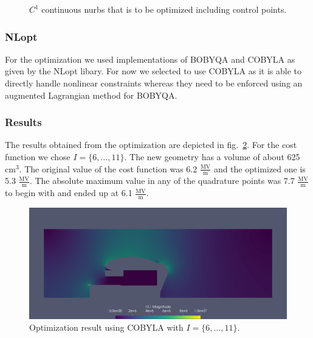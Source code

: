 \begin{center}
\begin{figure}[H]
  
  \caption{$C^1$ continuous nurbs that is to be optimized including control points.}
  \label{fig:nurbs}
\end{figure}
\end{center}

\subsubsection{NLopt}
For the optimization we used implementations of BOBYQA and COBYLA as given by the NLopt libary. For now we selected to use COBYLA as it is able to directly handle nonlinear constraints whereas they need to be enforced using an augmented Lagrangian method for BOBYQA.

\subsubsection{Results}
The results obtained from the optimization are depicted in fig.~\ref{fig:results_iga}. For the cost function we chose $I=\{ 6, \dotsc, 11 \}$. The new geometry has a volume of about 625 $\mathrm{cm}^3$. The original value of the cost function was 6.2 $\frac{\mathrm{MV}}{\mathrm{m}}$ and the optimized one is 5.3 $\frac{\mathrm{MV}}{\mathrm{m}}$. The absolute maximum value in any of the quadrature points was 7.7 $\frac{\mathrm{MV}}{\mathrm{m}}$ to begin with and ended up at 6.1 $\frac{\mathrm{MV}}{\mathrm{m}}$.

\begin{center}
\begin{figure}[H]
  \includegraphics[width=\textwidth]{figures/200kV/png/cobyla_run11}
  \caption{Optimization result using COBYLA with $I=\{ 6, \dots, 11 \}$.}
  \label{fig:results_iga}
\end{figure}
\end{center}

